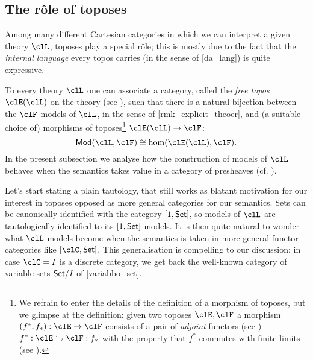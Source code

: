 \subsection{The r\^ole of toposes}
Among many different Cartesian categories in which we can interpret a given theory $\clL$, toposes play a special r\^ole; this is mostly due to the fact that the \emph{internal language} every topos carries (in the sense of \autoref{da_lang}) is quite expressive.

To every theory $\clL$ one can associate a category, called the \emph{free topos} $\clE(\clL)$ on the theory (see \cite{lambek1988introduction}), such that there is a natural bijection between the $\clF$-models of $\clL$, in the sense of  \autoref{rmk_explicit_theoer}, and (a suitable choice of) morphisms of toposes\footnote{We refrain to enter the details of the definition of a morphism of toposes, but we glimpse at the definition: given two toposes $\clE,\clF$ a morphism $(f^*,f_*): \clE \to \clF$ consists of a pair of \emph{adjoint} functors (see \cite[3]{Bor1}) $f^*: \clE \leftrightarrows \clF: f_*$ with the property that $f^*$ commutes with finite limits (see \cite[2.8.2]{Bor1}).} $\clE(\clL) \to \clF$:
\[\cate{Mod}(\clL, \clF) \cong \hom(\clE(\clL), \clF).\]
In the present subsection we analyse how the construction of models of $\clL$ behaves when the semantics takes value in a category of presheaves (cf. \cite[??]{Bor1}).

Let's start stating a plain tautology, that still works as blatant motivation for our interest in toposes opposed as more general categories for our semantics. Sets can be canonically identified with the category $[1,\mathsf{Set}]$, so models of $\clL$ are tautologically identified to its $[1,\mathsf{Set}]$-models. It is then quite natural to wonder what $\clL$-models become when the semantics is taken in more general functor categories like $[\clC,\Set]$. This generalisation is compelling to our discussion: in case $\clC=I$ is a discrete category, we get back the well-known category of variable sets $\mathsf{Set}/I$ of \autoref{variabbo_set}.

